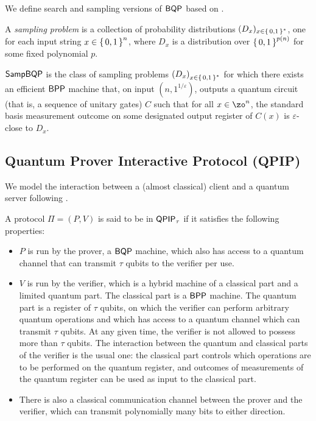 
We define search and sampling versions of $\operatorname{\mathsf{BQP}}$ based on \cite{aaronson_2013}.

\begin{definition} 
	A \emph{sampling problem} is a collection of probability distributions $(D_x)_{x\in\set{0, 1}^*}$, one for each input string $x\in\set{0,1}^n$, where $D_x$ is a distribution over $\set{0,1}^{p(n)}$ for some fixed polynomial $p$.
\end{definition}

\begin{definition} [$\SampBQP$]
	$\SampBQP$ is the class of sampling problems $\left(D_x\right)_{x\in\set{0, 1}^*}$ for which there exists an efficient $\operatorname{\mathsf{BPP}}$ machine that, on input $(n, 1^{1/\varepsilon})$, outputs a quantum circuit (that is, a sequence of unitary gates) $C$ such that for all $x\in\zo^n$, the standard basis measurement outcome on some designated output register  of $C(x)$ is $\varepsilon$-close to $D_x$.
\end{definition}

\subsection{Quantum Prover Interactive Protocol (QPIP)}
We model the interaction between a (almost classical) client and a quantum server following \cite{FOCS:Mahadev18a}.

\begin{definition}
	A protocol $\Pi=(P, V)$ is said to be in $\operatorname{\mathsf{QPIP}}_\tau$ if it satisfies the following properties:
	\begin{itemize}
		\item $P$ is run by the prover, a $\operatorname{\mathsf{BQP}}$ machine, which also has access to a quantum channel that can transmit $\tau$ qubits to the verifier per use.
		\item $V$ is run by the verifier, which is a hybrid machine of a classical part and a limited quantum part. The classical part is a $\operatorname{\mathsf{BPP}}$ machine. The quantum part is a register of $\tau$ qubits, on which the verifier can perform arbitrary quantum operations and which has access to a quantum channel which can transmit $\tau$ qubits. At any given time, the verifier is not allowed to possess more than $\tau$ qubits. The interaction between the quantum and classical parts of the verifier is the usual one: the classical part controls which operations are to be performed on the quantum register, and outcomes of measurements of the quantum register can be used as input to the classical part.
		\item There is also a classical communication channel between the prover and the verifier, which can transmit polynomially  many bits to either direction. 
	\end{itemize}
\end{definition}

